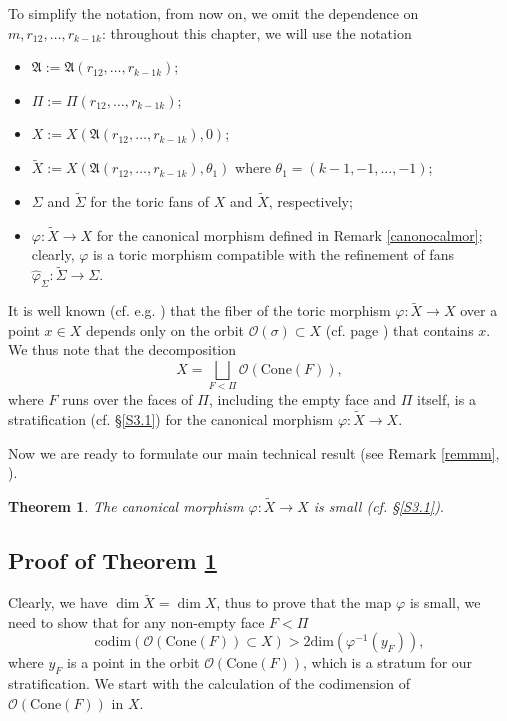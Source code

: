 \documentclass[11pt]{article}
\newtheorem{theorem}[theo]{Theorem}
\theoremstyle{definition}
\numberwithin{equation}{section}
\newcommand{\cone}{\mathrm{Cone}}
\newcommand{\A}{\mathfrak{A}}
\newcommand{\tilS}{\widetilde{\Sigma}}
\begin{document}
To simplify the notation, from now on, we omit the dependence on $m, 
r_{12}, \ldots ,r_{k-1 k}$:  
throughout this chapter, we will use the notation
\begin{itemize}\label{omitnot}
\item $\A:=\A(r_{12}, \ldots ,r_{k-1 k})$;
\item $\Pi := \Pi(r_{12}, \ldots ,r_{k-1 k})$;
\item $X:=X(\A(r_{12}, \ldots ,r_{k-1 k}), 0)$;
\item  $ \widetilde{X}:= X(\A(r_{12}, \ldots ,r_{k-1 k}), \theta_1)$ where $\theta_1= (k-1,-1, \ldots ,-1)$;
\item $\Sigma$ and $\widetilde{\Sigma}$ for the toric fans of $X$ and $\widetilde{X}$, respectively;
\item $\varphi:  \widetilde{X} \to X$ for the canonical morphism defined in Remark \ref{canonocalmor}; clearly, $\varphi$ is a toric morphism compatible with the refinement of fans $\widehat{\varphi}_\Sigma: \tilS\to \Sigma$.
\end{itemize}




It is well known (cf.  e.g. \cite{Yau}) that the fiber of the toric morphism 
$\varphi:  \widetilde{X} \to X$ over a point $x\in X$ depends only on the orbit 
$\mathcal{O}(\sigma)\subset X$ (cf.  page \pageref{notation:toricorb}) that 
contains $x$. We thus note  that the decomposition $$X = \bigsqcup_{F<\Pi} 
\mathcal{O}(\cone(F)),$$ where $F$ runs over the faces of $\Pi$, including  the 
empty face and $\Pi$ itself, is a stratification (cf.  \S\ref{S3.1}) for the 
canonical morphism $\varphi:\widetilde{X}\to X$. 



Now we are ready to formulate our main technical result (see Remark 
\ref{remmm}, \cite[Proposition 4.17]{MM}).

\begin{theorem}\label{smallmor}
The canonical morphism $\varphi:  \widetilde{X} \to X$ is small (cf.  
\S\ref{S3.1}). 
\end{theorem} 




\subsection{Proof of Theorem \ref{smallmor}}

Clearly, we have $ \dim \widetilde{X}=\dim X$, thus to prove that the map 
$\varphi$ is small, we need to show that for any non-empty face $F<\Pi$ 
\begin{equation}\label{oursmallest} 
\mathrm{codim}(\mathcal{O}(\cone(F))\subset X) > 2\mathrm{dim}(\varphi^{-1}(y_F)), 
\end{equation}
where $y_F$ is a point in the orbit $\mathcal{O}(\cone(F))$, which is a stratum 
for our stratification. We start with the calculation of the codimension of 
$\mathcal{O}(\cone(F))$ in $X$. 
\end{document}
